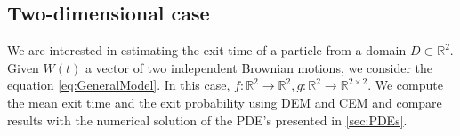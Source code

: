 \subsection{Two-dimensional case}
We are interested in estimating the exit time of a particle from a domain $D\subset\mathbb{R}^2$. Given $W(t)$ a  vector of two independent Brownian motions, we consider the equation \eqref{eq:GeneralModel}. In this case, $f\colon \mathbb{R}^2 \rightarrow \mathbb{R}^2, g\colon \mathbb{R}^2 \rightarrow \mathbb{R}^{2\times 2}$. We compute the mean exit time and the exit probability using DEM and CEM and compare results with the numerical solution of the PDE's presented in \ref{sec:PDEs}.





